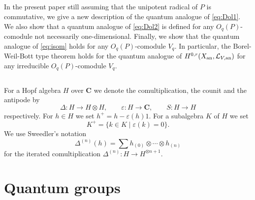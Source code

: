 \documentclass[a4paper, 12pt, leqno]{amsart}
\theoremstyle{definition}
\numberwithin{equation}{section}
\def\BC{{\mathbf{C}}}
\def\CL{{\mathcal L}}
\def\an{{\mathop{\rm an}\nolimits}}
\begin{document}
\subsection{}
In the present paper still assuming that the unipotent radical of $P$ is commutative, we 
give a new description of the quantum analogue of \eqref{eq:Dol1}.
We also show that a quantum analogue of \eqref{eq:Dol2} is defined 
for any $O_q(P)$-comodule not necessarily one-dimensional.
Finally, we show that the quantum analogue of \eqref{eq:isom} holds for any $O_q(P)$-comodule $V_q$.
In particular,
the Borel-Weil-Bott type theorem holds for the quantum analogue of $H^{0,r}(X_\an,\CL_{V,\an})$ for any irreducible $O_q(P)$-comodule $V_q$.

\subsection{}
For a Hopf algebra $H$ over $\BC$ we denote the comultiplication, the counit and the antipode by
\[
\Delta:H\to H\otimes H, 
\qquad
\varepsilon:H\to\BC,
\qquad
S:H\to H
\]
respectively.
For $h\in H$ we set $h^+=h-\varepsilon(h)1$.
For a subalgebra $K$ of $H$ we set
\[
K^+=\{k\in K\mid \varepsilon(k)=0\}.
\]
We use Sweedler's notation 
\[
\Delta^{(n)}(h)=\sum h_{(0)}\otimes\cdots\otimes h_{(n)}
\]
for the iterated comultiplication $\Delta^{(n)}:H\to H^{\otimes n+1}$.



\section{Quantum groups}
\end{document}
